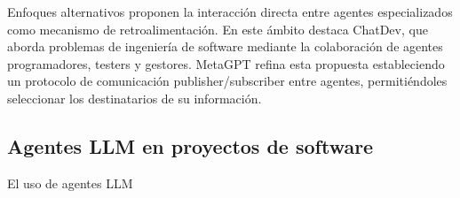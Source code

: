 \begin{itemize}
Enfoques alternativos proponen la interacción directa entre agentes especializados como mecanismo de retroalimentación\cite{zhuge_mindstorms_2023}\cite{du_improving_nodate}. En este ámbito destaca ChatDev\cite{qian_chatdev_2024}, que aborda problemas de ingeniería de software mediante la colaboración de agentes programadores, testers y gestores. MetaGPT\cite{hong_metagpt_2024} refina esta propuesta estableciendo un protocolo de comunicación publisher/subscriber entre agentes, permitiéndoles seleccionar los destinatarios de su información.
\end{itemize}

\subsection{Agentes LLM en proyectos de software}

El uso de agentes LLM 




















